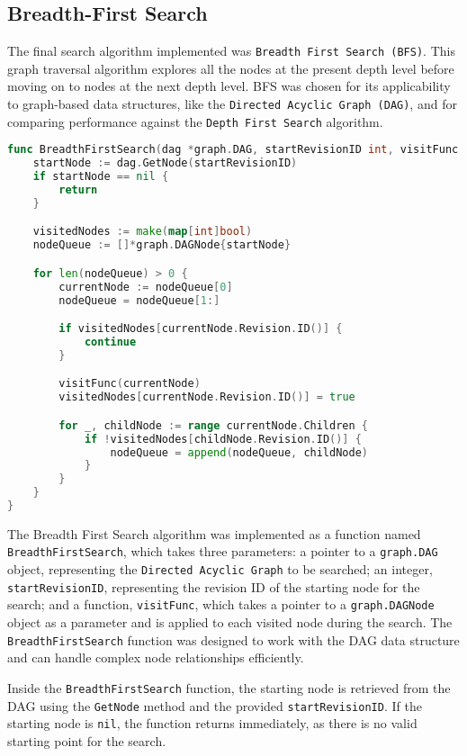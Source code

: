 \subsection{Breadth-First Search}
The final search algorithm implemented was \lstinline{Breadth First Search (BFS)}. This graph traversal algorithm explores all the nodes at the present depth level before moving on to nodes at the next depth level. BFS was chosen for its applicability to graph-based data structures, like the \lstinline{Directed Acyclic Graph (DAG)}, and for comparing performance against the \lstinline{Depth First Search} algorithm.

\begin{lstlisting}[language=go]
func BreadthFirstSearch(dag *graph.DAG, startRevisionID int, visitFunc func(node *graph.DAGNode)) {
	startNode := dag.GetNode(startRevisionID)
	if startNode == nil {
		return
	}

	visitedNodes := make(map[int]bool)
	nodeQueue := []*graph.DAGNode{startNode}

	for len(nodeQueue) > 0 {
		currentNode := nodeQueue[0]
		nodeQueue = nodeQueue[1:]

		if visitedNodes[currentNode.Revision.ID()] {
			continue
		}

		visitFunc(currentNode)
		visitedNodes[currentNode.Revision.ID()] = true

		for _, childNode := range currentNode.Children {
			if !visitedNodes[childNode.Revision.ID()] {
				nodeQueue = append(nodeQueue, childNode)
			}
		}
	}
}
\end{lstlisting}
\medskip

The Breadth First Search algorithm was implemented as a function named \lstinline{BreadthFirstSearch}, which takes three parameters: a pointer to a \lstinline{graph.DAG} object, representing the \lstinline{Directed Acyclic Graph} to be searched; an integer, \lstinline{startRevisionID}, representing the revision ID of the starting node for the search; and a function, \lstinline{visitFunc}, which takes a pointer to a \lstinline{graph.DAGNode} object as a parameter and is applied to each visited node during the search. The \lstinline{BreadthFirstSearch} function was designed to work with the DAG data structure and can handle complex node relationships efficiently.
\smallskip

Inside the \lstinline{BreadthFirstSearch} function, the starting node is retrieved from the DAG using the \lstinline{GetNode} method and the provided \lstinline{startRevisionID}. If the starting node is \lstinline{nil}, the function returns immediately, as there is no valid starting point for the search.
\smallskip

